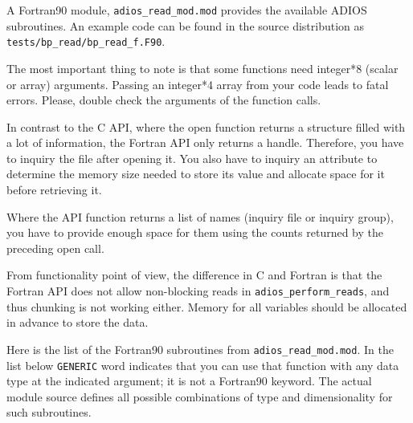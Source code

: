 A Fortran90 module, \verb+adios_read_mod.mod+ provides the available ADIOS subroutines. 
An example code can be found in the source distribution as 
\verb+tests/bp_read/bp_read_f.F90+.

The most important thing to note is that some functions need integer*8 (scalar 
or array) arguments. Passing an integer*4 array from your code leads to fatal errors. 
Please, double check the arguments of the function calls. 

In contrast to the C API, where the open function returns a structure filled with 
a lot of information, the Fortran API only returns a handle. Therefore, 
you have to inquiry the file after opening it.
You also have to inquiry an attribute to determine the memory 
size needed to store its value and allocate space for it before retrieving it. 

Where the API function returns a list of names (inquiry file or inquiry group), 
you have to provide enough space for them using the counts returned by the preceding 
open call. 

From functionality point of view, the difference in C and Fortran is that the 
Fortran API does not allow non-blocking reads in \verb+adios_perform_reads+, and thus
chunking is not working either. Memory for all variables should be allocated in advance 
to store the data.

Here is the list of the Fortran90 subroutines from \verb+adios_read_mod.mod+. 
In the list below \verb+GENERIC+ word indicates that you 
can use that function with any data type at the indicated argument; it is not
a Fortran90 keyword. The actual module source defines all possible combinations 
of type and dimensionality for such subroutines. 

